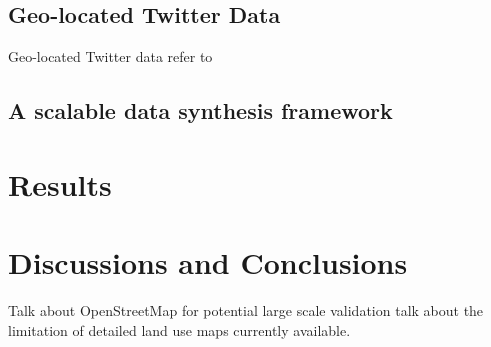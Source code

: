 \documentclass[a4paper, 11pt]{article}
\begin{document}
\subsection{Geo-located Twitter Data}
Geo-located Twitter data refer to  


\subsection{A scalable data synthesis framework}


\section{Results}


\section{Discussions and Conclusions}
Talk about OpenStreetMap for potential large scale validation
talk about the limitation of detailed land use maps currently available.





\end{document}
